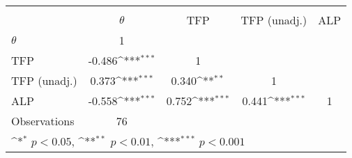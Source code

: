 {
\def\sym#1{\ifmmode^{#1}\else\(^{#1}\)\fi}
\begin{tabular}{l*{4}{c}}
\toprule
                &\multicolumn{4}{c}{}                                                       \\
                & $\theta$         &      TFP         &TFP (unadj.)         &      ALP         \\
\midrule
$\theta$        &        1         &                  &                  &                  \\
TFP             &   -0.486\sym{***}&        1         &                  &                  \\
TFP (unadj.)    &    0.373\sym{***}&    0.340\sym{**} &        1         &                  \\
ALP             &   -0.558\sym{***}&    0.752\sym{***}&    0.441\sym{***}&        1         \\
\midrule
Observations    &       76         &                  &                  &                  \\
\bottomrule
\multicolumn{5}{l}{\footnotesize \sym{*} \(p<0.05\), \sym{**} \(p<0.01\), \sym{***} \(p<0.001\)}\\
\end{tabular}
}
